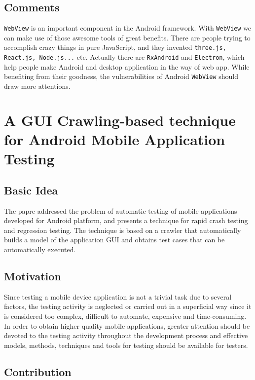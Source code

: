 \documentclass[a4paper]{article}
\begin{document}
    \subsection{Comments}
      \texttt{WebView} is an important component in the Android framework. With \texttt{WebView} we can make use of those awesome tools of great benefits. There are people trying to accomplish crazy things in pure JavaScript, and they invented \texttt{three.js, React.js, Node.js...} etc. Actually there are \texttt{RxAndroid} and \texttt{Electron}, which help people make Android and desktop application in the way of web app. While benefiting from their goodness, the vulnerabilities of Android \texttt{WebView} should draw more attentions.

  \section{A GUI Crawling-based technique for Android Mobile Application Testing}
    \subsection{Basic Idea}

      The papre addressed the problem of automatic testing of mobile applications developed for Android platform, and presents a technique for rapid crash testing and regression testing. The technique is based on a crawler that automatically builds a model of the application GUI and obtains test cases that can be automatically executed.

    \subsection{Motivation} 

      Since testing a mobile device application is not a trivial task due to several factors, the testing activity is neglected or carried out in a superficial way since it is considered too complex, difficult to automate, expensive and time-consuming. In order to obtain higher quality mobile applications, greater attention should be devoted to the testing activity throughout the development process and effective models, methods, techniques and tools for testing should be available for testers. 

    \subsection{Contribution}
\end{document}
